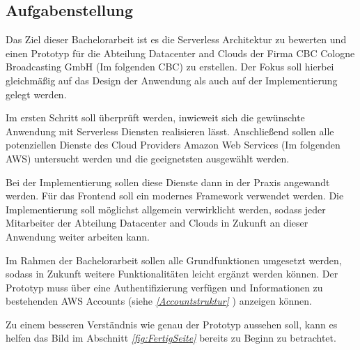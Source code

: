 \subsection{Aufgabenstellung}

Das Ziel dieser Bachelorarbeit ist es die Serverless Architektur zu bewerten und einen Prototyp für die Abteilung Datacenter and Clouds der Firma CBC Cologne Broadcasting GmbH (Im folgenden \glqq CBC\grqq) zu erstellen.
Der Fokus soll hierbei gleichmäßig auf das Design der Anwendung als auch auf der Implementierung gelegt werden.

Im ersten Schritt soll überprüft werden, inwieweit sich die gewünschte Anwendung mit Serverless Diensten realisieren lässt.
Anschließend sollen alle potenziellen Dienste des Cloud Providers Amazon Web Services (Im folgenden \glqq AWS\grqq) untersucht werden und die geeignetsten ausgewählt werden.

Bei der Implementierung sollen diese Dienste dann in der Praxis angewandt werden. Für das Frontend soll ein modernes Framework verwendet werden.
Die Implementierung soll möglichst allgemein verwirklicht werden, sodass jeder Mitarbeiter der Abteilung Datacenter and Clouds in Zukunft an dieser Anwendung weiter arbeiten kann.

Im Rahmen der Bachelorarbeit sollen alle Grundfunktionen umgesetzt werden, sodass in Zukunft weitere Funktionalitäten leicht ergänzt werden können.
Der Prototyp muss über eine Authentifizierung verfügen und Informationen zu bestehenden AWS Accounts (siehe \textit{\ref{Accountstruktur} }) anzeigen können.

Zu einem besseren Verständnis wie genau der Prototyp aussehen soll, kann es helfen das Bild im Abschnitt \textit{\ref{fig:FertigSeite} } bereits zu Beginn zu betrachtet.
